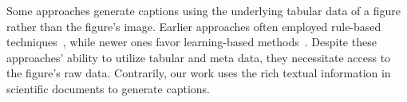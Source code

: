 Some approaches generate captions using the underlying tabular data of a figure rather than the figure's image. 
Earlier approaches often employed rule-based techniques~\cite{corio1999generation, demir2008generating, fasciano1996postgraphe, mittal1998describing}, while newer ones favor learning-based methods~\cite{barzilay-lapata-2005-collective,wiseman-etal-2017-challenges,moraes2014generating, zhu2021autochart, kanthara2022chart,obeid-hoque-2020-chart,reiter2005choosing,parikh-etal-2020-totto,chen-etal-2020-logical,gong-etal-2019-enhanced,su-etal-2021-plan-generate,chen-etal-2020-logic2text}. 
Despite these approaches' ability to utilize tabular and meta data, they necessitate access to the figure's raw data. 
Contrarily, our work uses the rich textual information in scientific documents to generate captions.

